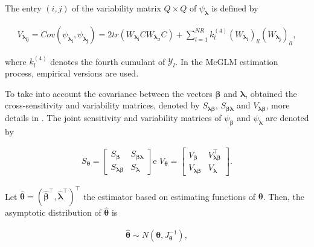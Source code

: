 \documentclass[article]{jss}\usepackage[]{graphicx}\usepackage[]{xcolor}
\begin{document}
\noindent The entry $(i,j)$ of the variability matrix $Q \times Q$ of $\psi_{\boldsymbol{\lambda}}$ is defined by

$$
  \begin{aligned}
V_{\boldsymbol{\lambda_{ij}}} = Cov\left ( \psi_{\boldsymbol{\lambda_{i}}}, \psi_{\boldsymbol{\lambda_{j}}} \right) = 2tr(W_{\boldsymbol{\lambda_{i}}} CW_{\boldsymbol{\lambda_{J}}} C) + \sum_{l=1}^{NR} k_{l}^{(4)} (W_{\boldsymbol{\lambda_{i}}})_{ll} (W_{\boldsymbol{\lambda_{j}}})_{ll},
  \end{aligned}
$$

\noindent where $k_{l}^{(4)}$ denotes the fourth cumulant of $\mathcal{Y}_{l}$. In the McGLM estimation process, empirical versions are used.

To take into account the covariance between the vectors $\boldsymbol{\beta}$ and $\boldsymbol{\lambda}$, \citet{Bonat16} obtained the cross-sensitivity and variability matrices, denoted by $S_{\boldsymbol{\lambda \beta}}$, $S_{\boldsymbol{\beta \lambda}}$ and $V_{\boldsymbol{\lambda \beta}}$, more details in \citet{Bonat16}. The joint sensitivity and variability matrices of $\psi_{\boldsymbol{\beta}}$ and $\psi_{\boldsymbol{\lambda}}$ are denoted by

$$
  \begin{aligned}
    S_{\boldsymbol{\theta}} = \begin{bmatrix}
      S_{\boldsymbol{\beta}} & S_{\boldsymbol{\beta\lambda}} \\ 
      S_{\boldsymbol{\lambda\beta}} & S_{\boldsymbol{\lambda}} 
      \end{bmatrix} \text{e } V_{\boldsymbol{\theta}} = \begin{bmatrix}
      V_{\boldsymbol{\beta}} & V^{\top}_{\boldsymbol{\lambda\beta}} \\ 
      V_{\boldsymbol{\lambda\beta}} & V_{\boldsymbol{\lambda}} 
    \end{bmatrix}.
  \end{aligned}
$$

Let $\boldsymbol{\hat{\theta}} = (\boldsymbol{\hat{\beta}^{\top}}, \boldsymbol{\hat{\lambda}^{\top}})^{\top}$ the estimator based on estimating functions of $\boldsymbol{\theta}$. Then, the asymptotic distribution of $\boldsymbol{\hat{\theta}}$ is

$$
  \begin{aligned}
    \boldsymbol{\hat{\theta}} \sim N(\boldsymbol{\theta}, J_{\boldsymbol{\theta}}^{-1}),
  \end{aligned}
$$
\end{document}
